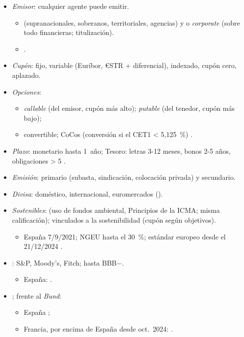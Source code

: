 \documentclass{article}
\begin{document}
\begin{columnas}
\begin{itemize}
\item \emph{Emisor}: cualquier agente puede emitir.
  \begin{itemize}
  \item {} (supranacionales, soberanos, territoriales, agencias) y  o \emph{corporate} (sobre todo financieras; titulización).
  \item {}.
  \end{itemize}
\item \emph{Cupón}: fijo, variable (Euríbor, €STR + diferencial), indexado, cupón cero, aplazado.
\item \emph{Opciones}:
  \begin{itemize}
  \item \emph{callable} (del emisor, cupón más alto); \emph{putable} (del tenedor, cupón más bajo);
  \item convertible; CoCos (conversión si el CET1 < 5,125~\%) .
  \end{itemize}
\item \emph{Plazo}: monetario hasta 1~año; Tesoro: letras 3-12 meses, bonos 2-5 años, obligaciones > 5 .
\item \emph{Emisión}: primario (subasta, sindicación, colocación privada) y secundario.
\item \emph{Divisa}: doméstico, internacional, euromercados ().
\item \emph{Sostenibles}:  (uso de fondos ambiental, Principios de la ICMA; misma calificación); vinculados a la sostenibilidad (cupón según objetivos).
  \begin{itemize}
  \item España 7/9/2021; NGEU hasta el 30~\%; estándar europeo desde el 21/12/2024 .
  \end{itemize}
\end{itemize}
\begin{itemize}
\item {}: S\&P, Moody's, Fitch;  hasta BBB$-$.
  \begin{itemize}
  \item España: .
  \end{itemize}
\item {};  frente al \emph{Bund}:
  \begin{itemize}
  \item España ;
  \item Francia, por encima de España desde oct.\ 2024: .
  \end{itemize}
\end{itemize}


\end{columnas}
\end{document}
